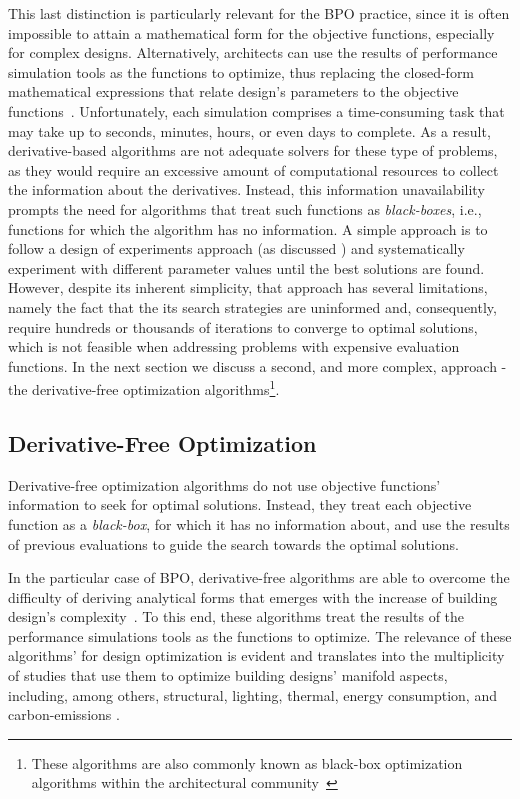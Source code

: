 	This last distinction is particularly relevant for the \ac{BPO} practice, since it is often impossible to attain a mathematical form for the objective functions, especially for complex designs. Alternatively, architects can use the results of performance simulation tools as the functions to optimize, thus replacing the closed-form mathematical expressions that relate design's parameters to the objective functions~\cite{Wortmann2016BBO}. Unfortunately, each simulation comprises a time-consuming task that may take up to seconds, minutes, hours, or even days to complete. As a result, derivative-based algorithms are not adequate solvers for these type of problems, as they would require an excessive amount of computational resources to collect the information about the derivatives. Instead, this information unavailability prompts the need for algorithms that treat such functions as \textit{black-boxes}, i.e., functions for which the algorithm has no information. A simple approach is to follow a design of experiments approach (as discussed ) and systematically experiment with different parameter values until the best solutions are found. However, despite its inherent simplicity, that approach has several limitations, namely the fact that the its search strategies are uninformed and, consequently, require hundreds or thousands of iterations to converge to optimal solutions, which is not feasible when addressing problems with expensive evaluation functions. In the next section we discuss a second, and more complex, approach - the derivative-free optimization algorithms\footnote{These algorithms are also commonly known as black-box optimization algorithms within the architectural community~\cite{Wortmann2016BBO}}.
	
	\subsection{Derivative-Free Optimization}
	\label{sec:dfo}
	 
	Derivative-free optimization algorithms do not use objective functions' information to seek for optimal solutions. Instead, they treat each objective function as a \textit{black-box}, for which it has no information about, and use the results of previous evaluations to guide the search towards the optimal solutions. 
	 
	In the particular case of \ac{BPO}, derivative-free algorithms are able to overcome the difficulty of deriving analytical forms that emerges with the increase of building design's complexity~\cite{Machairas2014}. To this end, these algorithms treat the results of the performance simulations tools as the functions to optimize. The relevance of these algorithms' for design optimization is evident and translates into the multiplicity of studies that use them to optimize building designs' manifold aspects, including, among others, structural, lighting, thermal, energy consumption, and carbon-emissions \cite{Evins2011,Evins2012MOO,Evins2013, Wortmann2015AdvSBO,Wortmann2016BBO,Wortmann2017GABESTCHOICE,Wortmann2017Opossum,Waibel2018}. 
	
